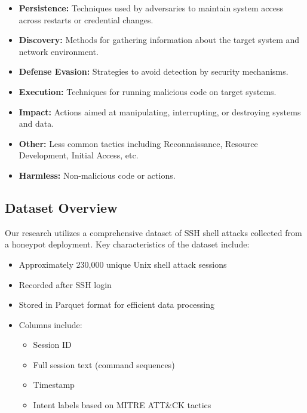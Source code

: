         \begin{itemize}
            \item \textbf{Persistence:} Techniques used by adversaries to maintain system access across restarts or credential changes.
            \item \textbf{Discovery:} Methods for gathering information about the target system and network environment.
            \item \textbf{Defense Evasion:} Strategies to avoid detection by security mechanisms.
            \item \textbf{Execution:} Techniques for running malicious code on target systems.
            \item \textbf{Impact:} Actions aimed at manipulating, interrupting, or destroying systems and data.
            \item \textbf{Other:} Less common tactics including Reconnaissance, Resource Development, Initial Access, etc.
            \item \textbf{Harmless:} Non-malicious code or actions.
        \end{itemize}

    \subsection{Dataset Overview}
    
        Our research utilizes a comprehensive dataset of SSH shell attacks collected from a honeypot deployment. Key characteristics of the dataset include:

        \begin{itemize}
            \item Approximately 230,000 unique Unix shell attack sessions
            \item Recorded after SSH login
            \item Stored in Parquet format for efficient data processing
            \item Columns include:
            \begin{itemize}
                \item Session ID
                \item Full session text (command sequences)
                \item Timestamp
                \item Intent labels based on MITRE ATT\&CK tactics
            \end{itemize}
        \end{itemize}

